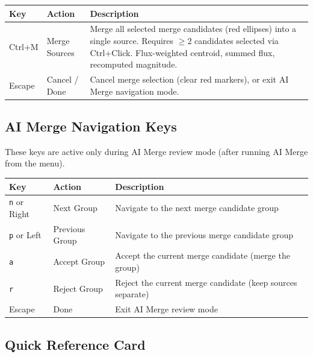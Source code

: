 \documentclass[11pt,fleqn]{book}
\begin{document}
\begin{center}
\begin{longtable}{C{2.0cm} L{3.5cm} L{7.0cm}}
\toprule
\textbf{Key} & \textbf{Action} & \textbf{Description} \\
\midrule
\endhead
Ctrl+M & Merge Sources & Merge all selected merge candidates (red ellipses) into a single source. Requires $\geq 2$ candidates selected via Ctrl+Click. Flux-weighted centroid, summed flux, recomputed magnitude. \\
\midrule
Escape & Cancel / Done & Cancel merge selection (clear red markers), or exit AI Merge navigation mode. \\
\bottomrule
\end{longtable}
\end{center}

\subsection{AI Merge Navigation Keys}

These keys are active only during AI Merge review mode (after running AI Merge from the menu).

\begin{center}
\begin{longtable}{C{2.5cm} L{3.5cm} L{6.5cm}}
\toprule
\textbf{Key} & \textbf{Action} & \textbf{Description} \\
\midrule
\endhead
\texttt{n} or Right & Next Group & Navigate to the next merge candidate group \\
\midrule
\texttt{p} or Left & Previous Group & Navigate to the previous merge candidate group \\
\midrule
\texttt{a} & Accept Group & Accept the current merge candidate (merge the group) \\
\midrule
\texttt{r} & Reject Group & Reject the current merge candidate (keep sources separate) \\
\midrule
Escape & Done & Exit AI Merge review mode \\
\bottomrule
\end{longtable}
\end{center}

\subsection{Quick Reference Card}
\end{document}
